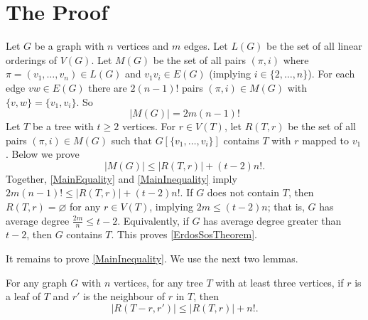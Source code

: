 \documentclass[a4paper,11pt]{article}
\renewcommand{\emptyset}{\varnothing}
\renewcommand{\geq}{\geqslant}
\renewcommand{\leq}{\leqslant}
\begin{document}
\section{The Proof}

Let $G$ be a graph with $n$ vertices and $m$ edges. 
Let $L(G)$ be the set of all linear orderings of $V(G)$. 
Let $M(G)$ be the set of all pairs $(\pi,i)$ where $\pi=(v_1,\dots,v_n) \in L(G)$ and $v_1v_i\in E(G)$ (implying $i\in\{2,\dots,n\}$). 
For each edge $vw\in E(G)$ there are $2(n-1)!$  pairs $(\pi,i)\in M(G)$ with $\{v,w\}=\{v_1,v_i\}$. 
So 
\begin{equation}
\label{MainEquality}
|M(G)|= 2m(n-1)!
\end{equation}
Let $T$ be a tree with $t\geq 2$ vertices. 
For  $r\in V(T)$, let $R(T,r)$ be the set of all pairs $(\pi,i)\in M(G)$ such that $G[\{v_1,\dots,v_i\}]$ contains $T$ with $r$ mapped to $v_1$. 
Below we prove
\begin{equation}
\label{MainInequality}
|M(G)| \leq |R(T,r)| + (t-2)n!.
\end{equation}
Together, \eqref{MainEquality} and \eqref{MainInequality} imply $2m(n-1)! \leq |R(T,r)| + (t-2)n!$. If $G$ does not contain $T$, then $R(T,r)=\emptyset$ for any $r\in V(T)$, implying
$2m \leq (t-2)n$; that is, $G$ has average degree $\frac{2m}{n}\leq t-2$. 
Equivalently, if $G$ has average degree greater than $t-2$, then $G$ contains $T$. 
This proves \cref{ErdosSosTheorem}.

It remains to prove \eqref{MainInequality}. We use the next two lemmas. 

\begin{lem}
\label{Leaf}
For any graph $G$ with $n$ vertices, for any tree $T$ with at least three vertices, if $r$ is a leaf of $T$ and $r'$ is the neighbour of $r$ in $T$, then 
\[ |R(T-r,r') | \leq |R(T,r)| + n!.\]
\end{lem}
\end{document}
